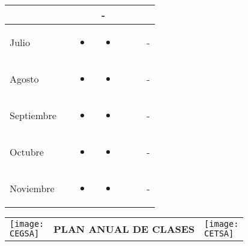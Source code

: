 \documentclass[landscape, a4paper, 10pt]{article}
\newcommand{\smallcellwidth}{0.7in}
\newcommand{\normalcellwidth}{1.2in}
\newcommand{\bigcellwidth}{2.0in}
\newcommand{\CEGSA}{cegsa-logo.png}
\newcommand{\CETSA}{cetsa-logo.png}
\begin{document}
\begin{longtable}{|m{\smallcellwidth}|p{\normalcellwidth}|p{\bigcellwidth}|p{\bigcellwidth}|p{\normalcellwidth}|p{\normalcellwidth}|p{\normalcellwidth}|}
\begin{itemize}
		\end{itemize} &
		  &
		  &
		 - \\
		\hline
		Julio &
		 &
		\begin{itemize}
			\item 
		\end{itemize} &
		\begin{itemize}
			\item 
		\end{itemize} &
		  &
		  &
		 - \\
		\hline
		Agosto &
		 &
		\begin{itemize}
			\item 
		\end{itemize} &
		\begin{itemize}
			\item 
		\end{itemize} &
		  &
		  &
		 - \\
		\hline
		Septiembre &
		 &
		\begin{itemize}
			\item 
		\end{itemize} &
		\begin{itemize}
			\item 
		\end{itemize} &
		  &
		  &
		 - \\
		\hline
		Octubre &
		 &
		\begin{itemize}
			\item 
		\end{itemize} &
		\begin{itemize}
			\item 
		\end{itemize} &
		  &
		  &
		 - \\
		\hline
		Noviembre &
		 &
		\begin{itemize}
			\item 
		\end{itemize} &
		\begin{itemize}
			\item 
		\end{itemize} &
		  &
		  &
		 - \\
		\hline

	\end{longtable}
	\pagebreak[4]
	\begin{tabularx}{\textwidth}{ >{\raggedright\arraybackslash}X >{\centering\arraybackslash}X >{\raggedleft\arraybackslash}X }
		\texttt{[image: \\CEGSA]} &
		\textbf{PLAN ANUAL DE CLASES} &
		\texttt{[image: \\CETSA]}
	\end{tabularx}
\end{document}
